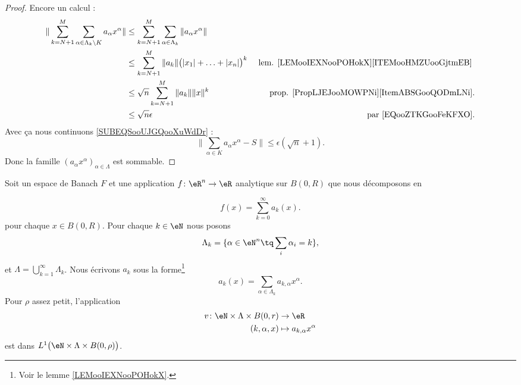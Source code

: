\begin{proof}
	Encore un calcul :
	\begin{subequations}
		\begin{align}
			\| \sum_{k=N+1}^M\sum_{\alpha\in \Lambda_k\setminus K}a_{\alpha}x^{\alpha} \| & \leq \sum_{k=N+1}^M\sum_{\alpha\in\Lambda_k}\| a_{\alpha}x^{\alpha} \|                                                                   \\
			                                                                              & \leq \sum_{k=N+1}^M\| a_k \|\big( | x_1 |+\ldots+| x_n | \big)^k       & \text{  lem. \ref{LEMooIEXNooPOHokX}\ref{ITEMooHMZUooGjtmEB}  } \\
			                                                                              & \leq \sqrt{n}\sum_{k=N+1}^M\| a_k \|\| x \|^k                          & \text{prop. \ref{PropLJEJooMOWPNi}\ref{ItemABSGooQODmLNi}}.
			\\
			                                                                              & \leq \sqrt{n}\epsilon                                                  & \text{par \eqref{EQooZTKGooFeKFXO}}.
		\end{align}
	\end{subequations}
	Avec ça nous continuons \eqref{SUBEQSooUJGQooXuWdDr} :
	\begin{equation}
		\| \sum_{\alpha\in K}a_{\alpha}x^{\alpha}-S \|\leq \epsilon(\sqrt{n}+1).
	\end{equation}
	Donc la famille \( (a_{\alpha}x^{\alpha})_{\alpha\in \Lambda}\) est sommable.
\end{proof}

\begin{lemma}	\label{LEMooYSDEooOEiXvl}
	Soit un espace de Banach \( F\) et une application \(f \colon \eR^n\to \eR  \) analytique sur \( B(0,R)\) que nous décomposons en

	\begin{equation}
		f(x)=\sum_{k=0}^{\infty}a_k(x).
	\end{equation}
	pour chaque \( x\in B(0,R)\). Pour chaque \( k\in \eN\) nous posons
	\begin{equation}
		\Lambda_k=\{ \alpha\in \eN^n\tq \sum_i\alpha_i=k \},
	\end{equation}
	et \( \Lambda=\bigcup_{k=1}^{\infty}\Lambda_k\). Nous écrivons \( a_k\) sous la forme\footnote{Voir le lemme \ref{LEMooIEXNooPOHokX}.}
	\begin{equation}
		a_k(x)=\sum_{\alpha\in\Lambda_k}a_{k,\alpha}x^{\alpha}.
	\end{equation}
	Pour \( \rho\) assez petit, l'application
	\begin{equation}
		\begin{aligned}
			v\colon \eN\times \Lambda \times B(0,r) & \to \eR                        \\
			(k,\alpha,x)                            & \mapsto a_{k,\alpha}x^{\alpha}
		\end{aligned}
	\end{equation}
	est dans \( L^1\big( \eN\times\Lambda\times B(0,\rho) \big)\).
\end{lemma}

